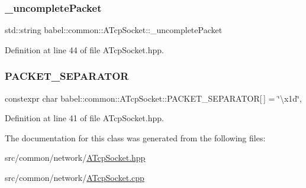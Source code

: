 \subsubsection{\texorpdfstring{\+\_\+uncomplete\+Packet}{\_uncompletePacket}}
{\footnotesize\ttfamily std\+::string babel\+::common\+::\+A\+Tcp\+Socket\+::\+\_\+uncomplete\+Packet\hspace{0.3cm}{\ttfamily [protected]}}



Definition at line 44 of file A\+Tcp\+Socket.\+hpp.

\mbox{\label{classbabel_1_1common_1_1_a_tcp_socket_a078160df0f68925ab42586e86f0b9bd4}} 
\subsubsection{\texorpdfstring{P\+A\+C\+K\+E\+T\+\_\+\+S\+E\+P\+A\+R\+A\+T\+OR}{PACKET\_SEPARATOR}}
{\footnotesize\ttfamily constexpr char babel\+::common\+::\+A\+Tcp\+Socket\+::\+P\+A\+C\+K\+E\+T\+\_\+\+S\+E\+P\+A\+R\+A\+T\+OR\mbox{[}$\,$\mbox{]} = \char`\"{}\textbackslash{}x1d\char`\"{}\hspace{0.3cm}{\ttfamily [static]}, {\ttfamily [protected]}}



Definition at line 41 of file A\+Tcp\+Socket.\+hpp.



The documentation for this class was generated from the following files\+:\begin{DoxyCompactItemize}
\item 
src/common/network/\mbox{\hyperlink{_a_tcp_socket_8hpp}{A\+Tcp\+Socket.\+hpp}}\item 
src/common/network/\mbox{\hyperlink{_a_tcp_socket_8cpp}{A\+Tcp\+Socket.\+cpp}}\end{DoxyCompactItemize}
